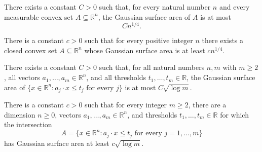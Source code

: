 \begin{theorem}
\label{BooleanAnalysis.GaussianSpace.surfaceArea_convex_le}
\leanok
{}
There exists a constant $C>0$ such that, for every natural number $n$ and every
measurable convex set $A\subseteq\mathbb R^n$, the Gaussian surface area of $A$ is at
most
\[C n^{1/4}.\]
\end{theorem}

\begin{theorem}
\label{BooleanAnalysis.GaussianSpace.exists_convex_surfaceArea_ge}
\leanok
{}
There is a constant $c>0$ such that for every positive integer $n$ there exists a closed
convex set $A\subseteq\mathbb R^n$ whose Gaussian surface area is at least $c n^{1/4}$.
\end{theorem}

\begin{theorem}
\label{BooleanAnalysis.GaussianSpace.surfaceArea_halfspace_intersection_le}
\leanok
{}
There exists a constant $C>0$ such that, for all natural numbers $n,m$ with $m\ge2$, all
vectors $a_1,\ldots,a_m\in\mathbb R^n$, and all thresholds $t_1,\ldots,t_m\in\mathbb R$,
the Gaussian surface area of $\{x\in\mathbb R^n: a_j\cdot x\le t_j\text{ for every }j\}$
is at most $C\sqrt{\log m}$.
\end{theorem}

\begin{theorem}
\label{BooleanAnalysis.GaussianSpace.exists_halfspace_intersection_surfaceArea_ge}
\leanok
{}
There is a constant $c>0$ such that for every integer $m\ge2$, there are a dimension
$n\ge0$, vectors $a_1,\ldots,a_m\in\mathbb R^n$, and thresholds
$t_1,\ldots,t_m\in\mathbb R$ for which the intersection
\[A=\{x\in\mathbb R^n: a_j\cdot x\le t_j\text{ for every }j=1,\ldots,m\}\]
has Gaussian surface area at least $c\sqrt{\log m}$.
\end{theorem}

